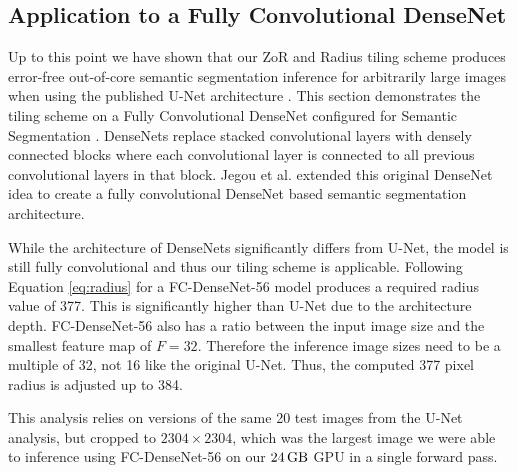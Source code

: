 \documentclass[runningheads]{llncs}
\begin{document}
\subsection{Application to a Fully Convolutional DenseNet}

Up to this point we have shown that our ZoR and Radius tiling scheme produces error-free out-of-core semantic segmentation inference for arbitrarily large images when using the published U-Net architecture \cite{Ronneberger2015a}. 
This section demonstrates the tiling scheme on a Fully Convolutional DenseNet configured for Semantic Segmentation \cite{Jegou2017}. DenseNets \cite{Huang2017} replace stacked convolutional layers with densely connected blocks where each convolutional layer is connected to all previous convolutional layers in that block. Jegou et al. \cite{Jegou2017} extended this original DenseNet idea to create a fully convolutional DenseNet based semantic segmentation architecture. 

While the architecture of DenseNets significantly differs from U-Net, the model is still fully convolutional and thus our tiling scheme is applicable. Following Equation \ref{eq:radius} 
for a FC-DenseNet-56 \cite{Jegou2017} model produces a required radius value of 377. This is significantly higher than U-Net due to the architecture depth. FC-DenseNet-56 also has a ratio between the input image size and the smallest feature map of $F = 32$. Therefore the inference image sizes need to be a multiple of 32, not 16 like the original U-Net. Thus, the computed 377 pixel radius is adjusted up to 384. 

This analysis relies on versions of the same 20 test images from the U-Net analysis, but cropped to $\num{2304} \times \num{2304}$, which was the largest image we were able to inference using FC-DenseNet-56 on our $\SI{24}{\giga\byte}$ GPU in a single forward pass. 
\end{document}
